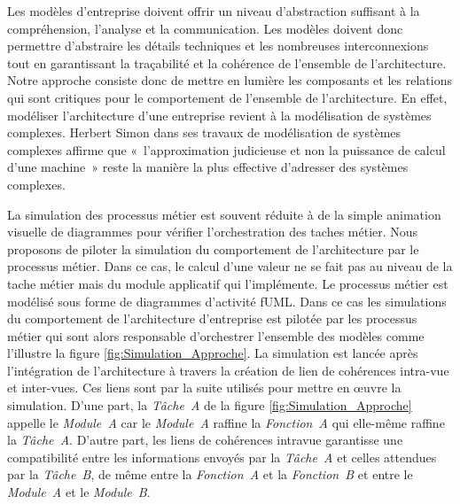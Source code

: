 Les modèles d'entreprise doivent offrir un niveau d'abstraction suffisant à la
compréhension, l'analyse et la communication. Les modèles doivent donc permettre
d'abstraire les détails techniques et les nombreuses interconnexions tout en
garantissant la traçabilité et la cohérence de l'ensemble de l'architecture.
Notre approche consiste donc de mettre en lumière les composants et les
relations qui sont critiques pour le comportement de l'ensemble de
l'architecture. En effet, modéliser l'architecture d'une entreprise revient à la
modélisation de systèmes complexes. Herbert Simon \cite{simon1990prediction}
dans ses travaux de modélisation de systèmes complexes affirme que
«~l'approximation judicieuse et non la puissance de calcul d'une machine~» reste
la manière la plus effective d'adresser des systèmes complexes.

La simulation des processus métier est souvent réduite à de la simple animation
visuelle de diagrammes pour vérifier l'orchestration des taches métier. Nous
proposons de piloter la simulation du comportement de l'architecture par le
processus métier. Dans ce cas, le calcul d'une valeur ne se fait pas au niveau
de la tache métier mais du module applicatif qui l'implémente. Le processus
métier est modélisé sous forme de diagrammes d'activité fUML. Dans ce cas les
simulations du comportement de l'architecture d'entreprise est pilotée par les
processus métier qui sont alors responsable d'orchestrer l'ensemble des modèles
comme l'illustre la figure \ref{fig:Simulation_Approche}. La simulation est
lancée après l'intégration de l'architecture à travers la création de lien de
cohérences intra-vue et inter-vues. Ces liens sont par la suite utilisés pour
mettre en œuvre la simulation. D'une part, la \textit{Tâche~A} de la figure
\ref{fig:Simulation_Approche} appelle le \textit{Module~A} car le
\textit{Module~A} raffine la \textit{Fonction~A} qui elle-même raffine la
\textit{Tâche~A}. D'autre part, les liens de cohérences intravue garantisse une
compatibilité entre les informations envoyés par la \textit{Tâche~A} et celles
attendues par la \textit{Tâche~B}, de même entre la \textit{Fonction~A} et la
\textit{Fonction~B} et entre le \textit{Module~A} et le \textit{Module~B}.

